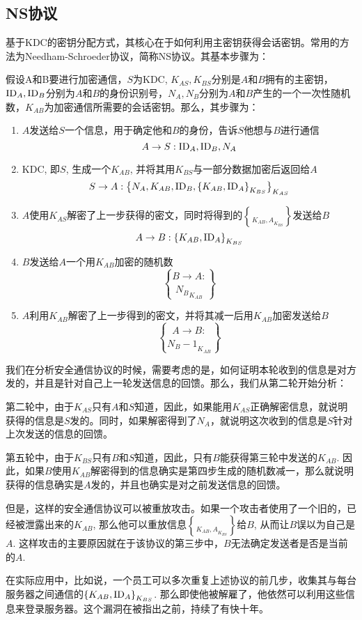 \subsection{NS协议}
基于KDC的密钥分配方式，其核心在于如何利用主密钥获得会话密钥。常用的方法为Needham-Schroeder协议，简称NS协议。其基本步骤为：\par
假设A和B要进行加密通信，$S$为KDC, $K_{AS}, K_{BS}$分别是$A$和$B$拥有的主密钥，$\mathrm{ID}_A, \mathrm{ID}_B$分别为$A$和$B$的身份识别号，$N_A, N_B$分别为$A$和$B$产生的一个一次性随机数，$K_{AB}$为加密通信所需要的会话密钥。那么，其步骤为：
\begin{enumerate}
	\item $A$发送给$S$一个信息，用于确定他和$B$的身份，告诉$S$他想与$B$进行通信
	\[A\to S: \mathrm{ID}_A, \mathrm{ID}_B, N_A\]
	\item KDC, 即$S$, 生成一个$K_{AB}$, 并将其用$K_{BS}$与一部分数据加密后返回给$A$
	\[S\to A: \left\{ {N_A, K_{AB}, \mathrm{ID}_B, \left\{ {K_{AB}, \mathrm{ID}_A} \right\}_{K_{BS}}} \right\}_{K_{AS}}\]
	\item $A$使用$K_{AS}$解密了上一步获得的密文，同时将得到的$\brace{K_{AB}, A}_{K_{BS}}$发送给$B$
	\[A\to B: \left\{ {K_{AB}, \mathrm{ID}_A} \right\}_{K_{BS}}\]
	\item $B$发送给$A$一个用$K_{AB}$加密的随机数
	\[B\to A: \brace{N_B}_{K_{AB}}\]
	\item $A$利用$K_{AB}$解密了上一步得到的密文，并将其减一后用$K_{AB}$加密发送给$B$
	\[A\to B: \brace{N_B - 1}_{K_{AB}}\]
\end{enumerate}

我们在分析安全通信协议的时候，需要考虑的是，如何证明本轮收到的信息是对方发的，并且是针对自己上一轮发送信息的回馈。那么，我们从第二轮开始分析：\par
第二轮中，由于$K_{AS}$只有$A$和$S$知道，因此，如果能用$K_{AS}$正确解密信息，就说明获得的信息是$S$发的。同时，如果解密得到了$N_A$，就说明这次收到的信息是$S$针对上次发送的信息的回馈。\par
第五轮中，由于$K_{BS}$只有$B$和$S$知道，因此，只有$B$能获得第三轮中发送的$K_{AB}$. 因此，如果$B$使用$K_{AB}$解密得到的信息确实是第四步生成的随机数减一，那么就说明获得的信息确实是$A$发的，并且也确实是对之前发送信息的回馈。\par
但是，这样的安全通信协议可以被重放攻击。如果一个攻击者使用了一个旧的，已经被泄露出来的$K_{AB}$, 那么他可以重放信息$\brace{K_{AB}, A}_{K_{BS}}$给$B$, 从而让$B$误以为自己是$A$. 这样攻击的主要原因就在于该协议的第三步中，$B$无法确定发送者是否是当前的$A$.\par
在实际应用中，比如说，一个员工可以多次重复上述协议的前几步，收集其与每台服务器之间通信的$\left\{ {K_{AB}, \mathrm{ID}_A} \right\}_{K_{BS}}$. 那么即使他被解雇了，他依然可以利用这些信息来登录服务器。这个漏洞在被指出之前，持续了有快十年。
